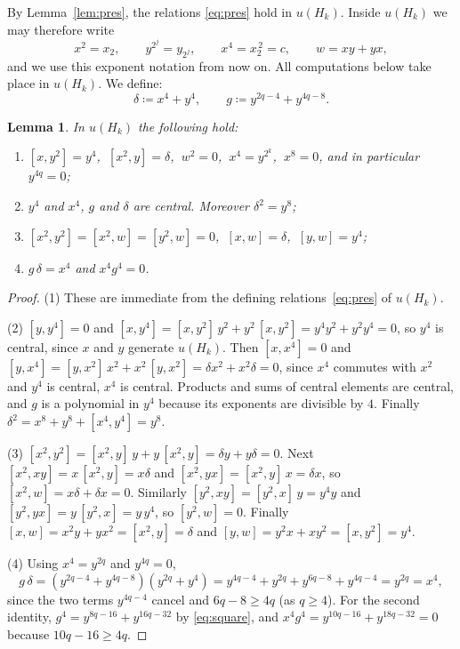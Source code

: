 \documentclass[11pt,reqno]{amsart}
\theoremstyle{plain}
\newtheorem{lemma}[theorem]{Lemma}
\theoremstyle{remark}
\begin{document}
By Lemma~\ref{lem:pres}, the relations \eqref{eq:pres} hold in $u(H_k)$.
Inside $u(H_k)$ we may therefore write
\[
x^2=x_2,\qquad y^{2^j}=y_{2^j},\qquad x^4=x_2^{\,2}=c,
\qquad w=xy+yx,
\]
and we use this exponent notation from now on. All computations below take
place in $u(H_k)$. We define:
\[
\delta\coloneqq x^4+y^4,\qquad
g\coloneqq y^{2q-4}+y^{4q-8}.
\]

\begin{lemma}\label{lem:tool2}
In $u(H_k)$ the following hold:
\begin{enumerate}
\item $[x,y^2]=y^4$, $\ [x^2,y]=\delta$, $\ w^2=0$, $\ x^4=y^{2^k}$,
      $\ x^8=0$, and in particular $y^{4q}=0$;
\item $y^4$ and $x^4$, $g$ and $\delta$ are central. Moreover $\delta^2=y^8$;
\item $[x^2,y^2]=[x^2,w]=[y^2,w]=0$, $\ [x,w]=\delta$, $\ [y,w]=y^4$;
\item $g\,\delta=x^4$ and $x^4g^4=0$.
\end{enumerate}
\end{lemma}

\begin{proof}
(1) These are immediate from the defining relations~\eqref{eq:pres} of $u(H_k)$.

(2) $[y,y^4]=0$ and
$[x,y^4]=[x,y^2]\,y^2+y^2\,[x,y^2]=y^4y^2+y^2y^4=0$, so $y^4$ is central, since $x$ and $y$ generate $u(H_k)$. Then $[x,x^4]=0$ and
$[y,x^4]=[y,x^2]\,x^2+x^2\,[y,x^2]=\delta x^2+x^2\delta=0$, since $x^4$
commutes with $x^2$ and $y^4$ is central, $x^4$ is central. Products and
sums of central elements are central, and $g$ is a polynomial in $y^4$
because its exponents are divisible by $4$. Finally
$\delta^2=x^8+y^8+[x^4,y^4]=y^8$.

(3) $[x^2,y^2]=[x^2,y]\,y+y\,[x^2,y]=\delta y+y\delta=0$. Next
$[x^2,xy]=x\,[x^2,y]=x\delta$ and $[x^2,yx]=[x^2,y]\,x=\delta x$, so
$[x^2,w]=x\delta+\delta x=0$. Similarly $[y^2,xy]=[y^2,x]\,y=y^4y$ and
$[y^2,yx]=y\,[y^2,x]=y\,y^4$, so $[y^2,w]=0$. Finally
$[x,w]=x^2y+yx^2=[x^2,y]=\delta$ and $[y,w]=y^2x+xy^2=[x,y^2]=y^4$.

(4) Using $x^4=y^{2q}$ and $y^{4q}=0$,
\[
g\,\delta=(y^{2q-4}+y^{4q-8})(y^{2q}+y^{4})
= y^{4q-4}+y^{2q}+y^{6q-8}+y^{4q-4}
= y^{2q}=x^4,
\]
since the two terms $y^{4q-4}$ cancel and $6q-8\ge4q$ (as $q\ge4$). For the
second identity, $g^4=y^{8q-16}+y^{16q-32}$ by \eqref{eq:square}, and
$x^4g^4=y^{10q-16}+y^{18q-32}=0$ because $10q-16\ge4q$.
\end{proof}
\end{document}
